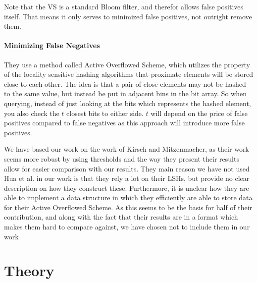 \documentclass[a4paper,11pt]{article}
\begin{document}
Note that the VS is a standard Bloom filter, and therefor allows false positives itself. That means it only serves to minimized false positives, not outright remove them.

\paragraph{Minimizing False Negatives}
They use a method called Active Overflowed Scheme, which utilizes the property of the locality sensitive hashing algorithms that proximate elements will be stored close to each other. The idea is that a pair of close elements may not be hashed to the same value, but instead be put in adjacent bins in the bit array. So when querying, instead of just looking at the bits which represents the hashed element, you also check the $t$ closest bits to either side. $t$ will depend on the price of false positives compared to false negatives as this approach will introduce more false positives.

We have based our work on the work of Kirsch and Mitzenmacher, as their work seems more robust by using thresholds and the way they present their results allow for easier comparison with our results. They main reason we have not used Hua et al. in our work is that they rely a lot on their LSHs, but provide no clear description on how they construct these. Furthermore, it is unclear how they are able to implement a data structure in which they efficiently are able to store data for their Active Overflowed Scheme. As this seems to be the basis for half of their contribution, and along with the fact that their results are in a format which makes them hard to compare against, we have chosen not to include them in our work

\section{Theory} %

\end{document}
